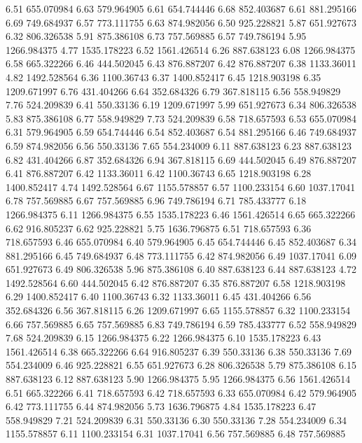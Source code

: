 6.51 	655.070984
6.63 	579.964905
6.61 	654.744446
6.68 	852.403687
6.61 	881.295166
6.69 	749.684937
6.57 	773.111755
6.63 	874.982056
6.50 	925.228821
5.87 	651.927673
6.32 	806.326538
5.91 	875.386108
6.73 	757.569885
6.57 	749.786194
5.95 	1266.984375
4.77 	1535.178223
6.52 	1561.426514
6.26 	887.638123
6.08 	1266.984375
6.58 	665.322266
6.46 	444.502045
6.43 	876.887207
6.42 	876.887207
6.38 	1133.36011
4.82 	1492.528564
6.36 	1100.36743
6.37 	1400.852417
6.45 	1218.903198
6.35 	1209.671997
6.76 	431.404266
6.64 	352.684326
6.79 	367.818115
6.56 	558.949829
7.76 	524.209839
6.41 	550.33136
6.19 	1209.671997
5.99 	651.927673
6.34 	806.326538
5.83 	875.386108
6.77 	558.949829
7.73 	524.209839
6.58 	718.657593
6.53 	655.070984
6.31 	579.964905
6.59 	654.744446
6.54 	852.403687
6.54 	881.295166
6.46 	749.684937
6.59 	874.982056
6.56 	550.33136
7.65 	554.234009
6.11 	887.638123
6.23 	887.638123
6.82 	431.404266
6.87 	352.684326
6.94 	367.818115
6.69 	444.502045
6.49 	876.887207
6.41 	876.887207
6.42 	1133.36011
6.42 	1100.36743
6.65 	1218.903198
6.28 	1400.852417
4.74 	1492.528564
6.67 	1155.578857
6.57 	1100.233154
6.60 	1037.17041
6.78 	757.569885
6.67 	757.569885
6.96 	749.786194
6.71 	785.433777
6.18 	1266.984375
6.11 	1266.984375
6.55 	1535.178223
6.46 	1561.426514
6.65 	665.322266
6.62 	916.805237
6.62 	925.228821
5.75 	1636.796875
6.51 	718.657593
6.36 	718.657593
6.46 	655.070984
6.40 	579.964905
6.45 	654.744446
6.45 	852.403687
6.34 	881.295166
6.45 	749.684937
6.48 	773.111755
6.42 	874.982056
6.49 	1037.17041
6.09 	651.927673
6.49 	806.326538
5.96 	875.386108
6.40 	887.638123
6.44 	887.638123
4.72 	1492.528564
6.60 	444.502045
6.42 	876.887207
6.35 	876.887207
6.58 	1218.903198
6.29 	1400.852417
6.40 	1100.36743
6.32 	1133.36011
6.45 	431.404266
6.56 	352.684326
6.56 	367.818115
6.26 	1209.671997
6.65 	1155.578857
6.32 	1100.233154
6.66 	757.569885
6.65 	757.569885
6.83 	749.786194
6.59 	785.433777
6.52 	558.949829
7.68 	524.209839
6.15 	1266.984375
6.22 	1266.984375
6.10 	1535.178223
6.43 	1561.426514
6.38 	665.322266
6.64 	916.805237
6.39 	550.33136
6.38 	550.33136
7.69 	554.234009
6.46 	925.228821
6.55 	651.927673
6.28 	806.326538
5.79 	875.386108
6.15 	887.638123
6.12 	887.638123
5.90 	1266.984375
5.95 	1266.984375
6.56 	1561.426514
6.51 	665.322266
6.41 	718.657593
6.42 	718.657593
6.33 	655.070984
6.42 	579.964905
6.42 	773.111755
6.44 	874.982056
5.73 	1636.796875
4.84 	1535.178223
6.47 	558.949829
7.21 	524.209839
6.31 	550.33136
6.30 	550.33136
7.28 	554.234009
6.34 	1155.578857
6.11 	1100.233154
6.31 	1037.17041
6.56 	757.569885
6.48 	757.569885
